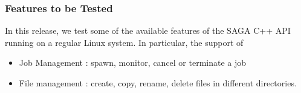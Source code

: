 







\subsubsection{Features to be Tested}

In this release, we test some of the available features of the SAGA C++
API running on a regular Linux system. In particular, the support of
\begin{itemize}
 \item Job Management : spawn, monitor, cancel or terminate a job
 \item File management : create, copy, rename, delete files in different
       directories.
\end{itemize}

